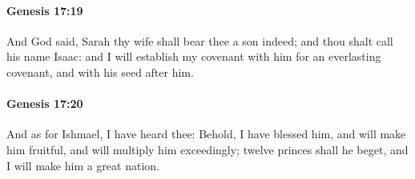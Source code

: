 		\paragraph{Genesis 17:19} %
			\label{GENESIS-17-19}

			And God said, Sarah thy wife shall bear thee a son indeed; and thou shalt call his name Isaac: and I will establish my covenant with him for an everlasting covenant, and with his seed after him.


		\paragraph{Genesis 17:20} %
			\label{GENESIS-17-20}

			And as for Ishmael, I have heard thee: Behold, I have blessed him, and will make him fruitful, and will multiply him exceedingly; twelve princes shall he beget, and I will make him a great nation.

